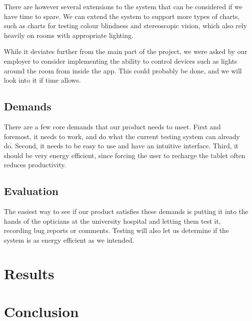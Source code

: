 \documentclass[12pt,a4paper,notitlepage]{report}
\begin{document}

There are however several extensions to the system that can be considered if we have time to spare. We can extend the system to support more types of charts, such as charts for testing colour blindness and stereoscopic vision, which also rely heavily on rooms with appropriate lighting.

While it deviates further from the main part of the project, we were asked by our employer to consider implementing the ability to control devices such as lights around the room from inside the app. This could probably be done, and we will look into it if time allows.

\section{Demands} %
There are a few core demands that our product needs to meet. First and foremost, it needs to work, and do what the current testing system can already do. Second, it needs to be easy to use and have an intuitive interface. Third, it should be very energy efficient, since forcing the user to recharge the tablet often reduces productivity. 

\section{Evaluation} %
The easiest way to see if our product satisfies these demands is putting it into the hands of the opticians at the university hospital and letting them test it, recording bug reports or comments. Testing will also let us determine if the system is as energy efficient as we intended.

\chapter{Results}

\chapter{Conclusion}

{}

\end{document}
